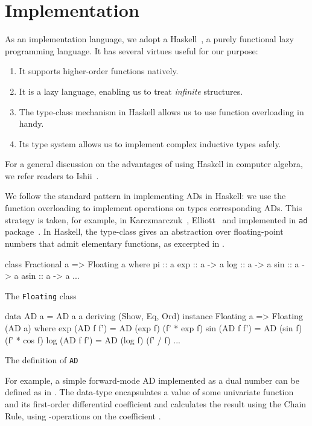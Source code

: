 \documentclass[./rims-smooth-paper.tex]{subfiles}
\begin{document}
\section{Implementation}
\label{sec:impl}
As an implementation language, we adopt a Haskell~\cite{haskell.org:2021tt}, a purely functional lazy programming language.
It has several virtues useful for our purpose:
\begin{enumerate}
\item It supports higher-order functions natively.
\item It is a lazy language, enabling us to treat \emph{infinite} structures.
\item The type-class mechanism in Haskell allows us to use function overloading in handy.
\item Its type system allows us to implement complex inductive types safely.
\end{enumerate}
For a general discussion on the advantages of using Haskell in computer algebra, we refer readers to Ishii~\cite{ISHII:2018ek}.

We follow the standard pattern in implementing ADs in Haskell: we use the function overloading to implement operations on types corresponding ADs.
This strategy is taken, for example, in Karczmarczuk~\cite{Karczmarczuk:2001ww}, Elliott~\cite{Elliott2009-beautiful-differentiation} and implemented in \texttt{ad} package~\cite{Kmett:2010aa}.
In Haskell, the  type-class gives an abstraction over floating-point numbers that admit elementary functions, as excerpted in .
\begin{listing}[tbp]
\begin{code}
class Fractional a => Floating a where
  pi :: a
  exp :: a -> a
  log :: a -> a
  sin :: a -> a
  asin :: a -> a
  ...
\end{code}
\caption{The \texttt{Floating} class\label{lst:cls-floating}}
\end{listing}
\begin{listing}[tbp]
\begin{code}
  data AD a = AD a a deriving (Show, Eq, Ord)
  instance Floating a => Floating (AD a) where
    exp (AD f f') = AD (exp f) (f' * exp f)
    sin (AD f f') = AD (sin f) (f' * cos f)
    log (AD f f') = AD (log f) (f' / f)
    ...
\end{code}
\caption{The definition of \texttt{AD}\label{lst:def-AD}}
\end{listing}

For example, a simple forward-mode AD implemented as a dual number can be defined as in .
The data-type  encapsulates a value of some univariate function and its first-order differential coefficient and calculates the result using the Chain Rule, using -operations on the coefficient .
\end{document}
